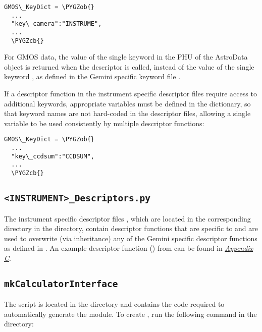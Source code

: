 \documentclass[letterpaper,10pt,english]{sphinxmanual}
\def\PYGZob{\char`\{}
\def\PYGZcb{\char`\}}
\begin{document}
\begin{Verbatim}[commandchars=\\\{\}]
GMOS\_KeyDict = \PYGZob{}
  ...
  "key\_camera":"INSTRUME",
  ...
  \PYGZcb{}
\end{Verbatim}

For GMOS data, the value of the single keyword  in the PHU of the
AstroData object is returned when the  descriptor is called, instead
of the value of the single keyword , as defined in the Gemini
specific keyword file .

If a descriptor function in the instrument specific descriptor files
 require access to additional keywords,
appropriate variables must be defined in the 
dictionary, so that keyword names are not hard-coded in the descriptor files,
allowing a single variable to be used consistently by multiple descriptor
functions:

\begin{Verbatim}[commandchars=\\\{\}]
GMOS\_KeyDict = \PYGZob{}
  ...
  "key\_ccdsum":"CCDSUM",
  ...
  \PYGZcb{}
\end{Verbatim}


\subsection{\texttt{\textless{}INSTRUMENT\textgreater{}\_Descriptors.py}}
\label{coding:instrument-descriptors-py}
The instrument specific descriptor files , which
are located in the corresponding  directory in the
 directory, contain descriptor
functions that are specific to  and are used to overwrite (via
inheritance) any of the Gemini specific descriptor functions as defined in
. An example descriptor function ()
from  can be found in {\hyperref[appendices/appendixC:appendix-descriptor]{\emph{Appendix C}}}.


\subsection{\texttt{mkCalculatorInterface}}
\label{coding:mkcalculatorinterface}
The  script is located in the 
directory and contains the code required to automatically generate the
 module. To create
, run the following command in the
 directory:
\end{document}
